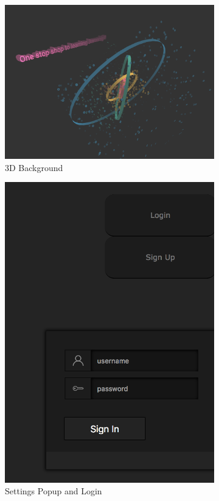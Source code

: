 \documentclass[a4paper]{article}
\begin{document}
\begin{figure}[h!]
  \centering
  \begin{subfigure}[b]{0.6\linewidth}
    \includegraphics[width=\linewidth]{images/3d_background.png}
    \caption{3D Background}
    \label{fig:3d_background}
  \end{subfigure}
   \begin{subfigure}[b]{0.3\linewidth}
    \includegraphics[width=\linewidth]{images/login.png}
    \caption{Settings Popup and Login}
    \label{fig:login}
  \end{subfigure}
  \caption{}
\end{figure}
\end{document}
